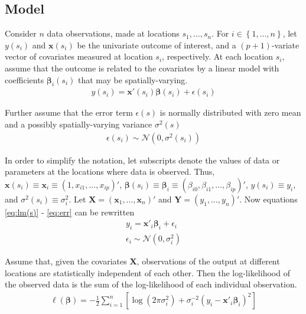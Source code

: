 \documentclass[authoryear, review, 11pt]{elsarticle}
\begin{document}
	\subsection{Model}
	Consider $n$ data observations, made at locations $s_1, \dots, s_n$. For $i \in \left\{1, \dots, n \right\}$, let $y(s_i)$ and $\bm{x}(s_i)$ be the univariate outcome of interest, and a $(p+1)$-variate vector of covariates measured at location $s_i$, respectively. At each location $s_i$, assume that the outcome is related to the covariates by a linear model with coefficients $\bm{\beta}_i(s_i)$ that may be spatially-varying.
	\begin{eqnarray}
		y(s_i) = \bm{x}'(s_i) \bm{\beta}(s_i) + \epsilon(s_i)
	\label{eq:lm(s)}
	\end{eqnarray}
	
	Further assume that the error term $\epsilon(s)$ is normally distributed with zero mean and a possibly spatially-varying variance $\sigma^2(s)$
	\begin{eqnarray}
		\epsilon(s_i) \sim \mathcal{N} \left( 0,\sigma^2(s_i) \right)
	\label{eq:err}
	\end{eqnarray}
	
	In order to simplify the notation, let subscripts denote the values of data or parameters at the locations where data is observed. Thus, $\bm{x}(s_i) \equiv \bm{x}_i \equiv \left( 1, x_{i1}, \dots, x_{ip} \right)'$, $\bm{\beta}(s_i) \equiv \bm{\beta}_i \equiv \left(\beta_{i0}, \beta_{i1}, \dots, \beta_{ip} \right)'$, $y(s_i) \equiv y_i$, and $\sigma^2(s_i) \equiv \sigma^2_i$. Let $\bm{X} = \left( \bm{x}_1, \dots, \bm{x}_n \right)'$ and $\bm{Y} = \left( y_1, \dots, y_n \right)'$. Now equations \ref{eq:lm(s)} - \ref{eq:err} can be rewritten
	\begin{eqnarray}
		y_i = \bm{x}'_i \bm{\beta}_i + \epsilon_i\\
		\epsilon_i \sim \mathcal{N} \left( 0,\sigma_i^2 \right)
	\end{eqnarray}
	
	Assume that, given the covariates $\bm{X}$, observations of the output at different locations are statistically independent of each other. Then the log-likelihood of the observed data is the sum of the log-likelihood of each individual observation.
	 \begin{eqnarray}
	 	\ell\left( \bm{\beta} \right) = - \frac{1}{2} \sum_{i=1}^n \left[  \log \left( 2 \pi \sigma^2_i\right) +  \sigma^{-2}_i  \left(y_i - \bm{x}'_i\bm{\beta}_i \right)^2  \right]
	\end{eqnarray}
	
\end{document}
